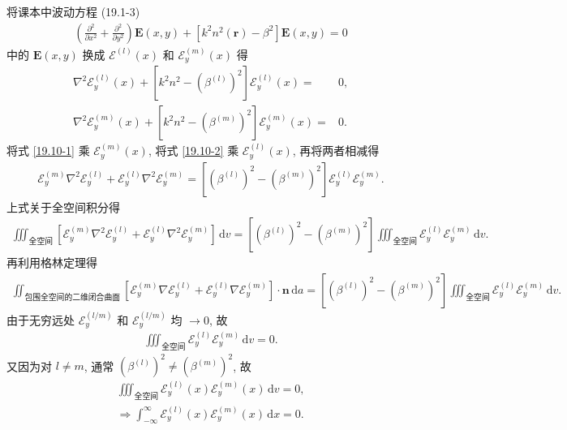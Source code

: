 \documentclass{note}
\begin{document}
\begin{pf}
    将课本中波动方程 (19.1-3)
    \begin{align}
        \left(\frac{\partial^2}{\partial x^2}+\frac{\partial^2}{\partial y^2}\right)\bm{E}(x,y)+[k^2n^2(\bm{r})-\beta^2]\bm{E}(x,y)=0
    \end{align}
    中的 $\bm{E}(x,y)$ 换成 $\mathcal{E}^{(l)}(x)$ 和 $\mathcal{E}_y^{(m)}(x)$ 得
    \begin{align}
        \label{19.10-1}
        \nabla^2\mathcal{E}_y^{(l)}(x)+[k^2n^2-(\beta^{(l)})^2]\mathcal{E}_y^{(l)}(x)=&0,\\
        \label{19.10-2}
        \nabla^2\mathcal{E}_y^{(m)}(x)+[k^2n^2-(\beta^{(m)})^2]\mathcal{E}_y^{(m)}(x)=&0.
    \end{align}
    将式 \eqref{19.10-1} 乘 $\mathcal{E}_y^{(m)}(x)$, 将式 \eqref{19.10-2} 乘 $\mathcal{E}_y^{(l)}(x)$, 再将两者相减得
    \begin{align}
        \mathcal{E}_y^{(m)}\nabla^2\mathcal{E}_y^{(l)}+\mathcal{E}_y^{(l)}\nabla^2\mathcal{E}_y^{(m)}=[(\beta^{(l)})^2-(\beta^{(m)})^2]\mathcal{E}_y^{(l)}\mathcal{E}_y^{(m)}.
    \end{align}
    上式关于全空间积分得
    \begin{align}
        \iiint_{\text{全空间}}[\mathcal{E}_y^{(m)}\nabla^2\mathcal{E}_y^{(l)}+\mathcal{E}_y^{(l)}\nabla^2\mathcal{E}_y^{(m)}]\,\mathrm{d}v=[(\beta^{(l)})^2-(\beta^{(m)})^2]\iiint_{\text{全空间}}\mathcal{E}_y^{(l)}\mathcal{E}_y^{(m)}\,\mathrm{d}v.
    \end{align}
    再利用格林定理得
    \begin{align}
        \iint_{\text{包围全空间的二维闭合曲面}}[\mathcal{E}_y^{(m)}\nabla\mathcal{E}_y^{(l)}+\mathcal{E}_y^{(l)}\nabla\mathcal{E}_y^{(m)}]\cdot\bm{n}\,\mathrm{d}a=[(\beta^{(l)})^2-(\beta^{(m)})^2]\iiint_{\text{全空间}}\mathcal{E}_y^{(l)}\mathcal{E}_y^{(m)}\,\mathrm{d}v.
    \end{align}
    由于无穷远处 $\mathcal{E}_y^{(l/m)}$ 和 $\mathcal{E}_y^{(l/m)}$ 均 $\rightarrow 0$, 故
    \begin{align}
        [(\beta^{(l)})^2-(\beta^{(m)})^2]\iiint_{\text{全空间}}\mathcal{E}_y^{(l)}\mathcal{E}_y^{(m)}\,\mathrm{d}v=0.
    \end{align}
    又因为对 $l\neq m$, 通常 $(\beta^{(l)})^2\neq(\beta^{(m)})^2$, 故
    \begin{gather}
        \iiint_{\text{全空间}}\mathcal{E}_y^{(l)}(x)\mathcal{E}_y^{(m)}(x)\,\mathrm{d}v=0,\\
        \Longrightarrow\int_{-\infty}^{\infty}\mathcal{E}_y^{(l)}(x)\mathcal{E}_y^{(m)}(x)\,\mathrm{d}x=0.
    \end{gather}
\end{pf}
\ifx\allfiles\undefined
\end{document}
